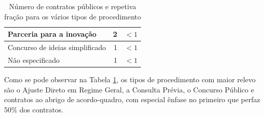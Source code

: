 \begin{table}[H]
{\begin{tabular}{lrr}
			\rowcolor[HTML]{EFEFEF} 
			Parceria para a inovação                                                       & 2                                                                        & $< 1$                                                          \\ \hline
			Concurso de ideias simplificado                                                & 1                                                                        & $< 1$                                                          \\ \hline
			\rowcolor[HTML]{EFEFEF} 
			Não especificado & 1                                                                        & $< 1$                                                           \\ \hline
		\end{tabular}%
	}
	\caption{Número de contratos públicos e repetiva fração para os vários tipos de procedimento}
	\label{tab:contratos}	
\end{table}

Como se pode observar na Tabela \ref{tab:contratos}, os tipos de procedimento com maior relevo são o Ajuste Direto em Regime Geral, a Consulta Prévia, o Concurso Público e contratos ao abrigo de acordo-quadro, com especial ênfase no primeiro que perfaz 50\% dos contratos. 


